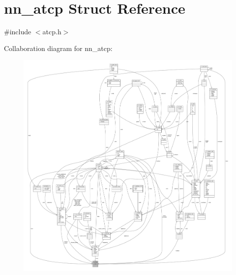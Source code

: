 \hypertarget{structnn__atcp}{}\section{nn\+\_\+atcp Struct Reference}
\label{structnn__atcp}


{\ttfamily \#include $<$atcp.\+h$>$}



Collaboration diagram for nn\+\_\+atcp\+:\nopagebreak
\begin{figure}[H]
\begin{center}
\leavevmode
\includegraphics[width=350pt]{structnn__atcp__coll__graph}
\end{center}
\end{figure}
